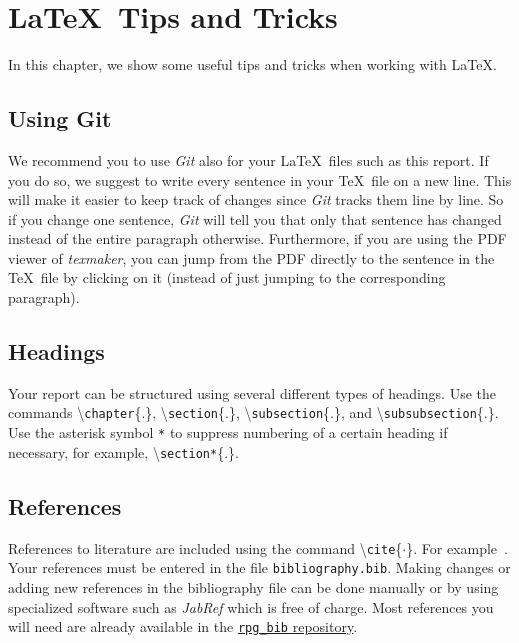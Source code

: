 \chapter{\LaTeX\ Tips and Tricks}\label{chap:tipstricks}

In this chapter, we show some useful tips and tricks when working with \LaTeX.

\section{Using Git}

We recommend you to use \emph{Git} also for your \LaTeX\ files such as this report.
If you do so, we suggest to write every sentence in your \TeX\ file on a new line.
This will make it easier to keep track of changes since \emph{Git} tracks them line by line.
So if you change one sentence, \emph{Git} will tell you that only that sentence has changed instead of the entire paragraph otherwise.
Furthermore, if you are using the PDF viewer of \emph{texmaker}, you can jump from the PDF directly to the sentence in the \TeX\ file by clicking on it (instead of just jumping to the corresponding paragraph).

\section{Headings}

Your report can be structured using several different types of headings.
Use the commands \textbackslash\texttt{chapter}\{.\}, \textbackslash\texttt{section}\{.\}, \textbackslash\texttt{subsection}\{.\}, and \textbackslash\texttt{subsubsection}\{.\}.
Use the asterisk symbol \texttt{*} to suppress numbering of a certain heading if necessary, for example, \textbackslash\texttt{section*}\{.\}.


\section{References}\label{sec:references}

References to literature are included using the command \textbackslash\texttt{cite}\{$\cdot$\}.
For example~\cite{KleinMurray2007,Strasdat2010WhyFilter}.
Your references must be entered in the file \texttt{bibliography.bib}.
Making changes or adding new references in the bibliography file can be done manually or by using specialized software such as \textit{JabRef} which is free of charge.
Most references you will need are already available in the \href{https://github.com/uzh-rpg/rpg_bib}{\texttt{rpg\_bib} repository}.

